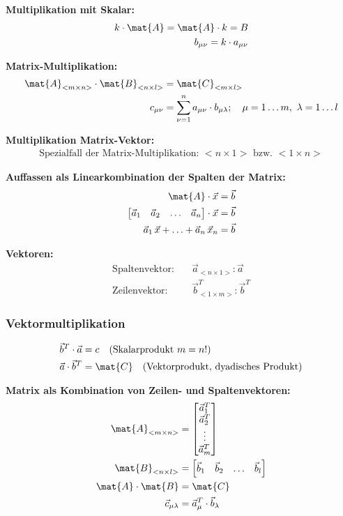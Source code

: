 \textbf{Multiplikation mit Skalar:}
\begin{align*}
k \cdot \mat{A} = \mat{A} \cdot k = B\\
b_{\mu\nu} = k \cdot a_{\mu\nu}
\end{align*}

\textbf{Matrix-Multiplikation:}
\begin{align*}
\mat{A}_{<m\times n>} \cdot \mat{B}_{<n\times l>} &= \mat{C}_{<m\times l>}\\
c_{\mu\nu} &= \sum_{\nu=1}^{n} a_{\mu\nu} \cdot b_{\mu\lambda};\quad \mu=1\ldots m,\ \lambda=1\ldots l
\end{align*}

\textbf{Multiplikation Matrix-Vektor:}
\begin{align*}
\text{Spezialfall der Matrix-Multiplikation: } <n\times 1> \text{ bzw. } <1\times n>
\end{align*}

\textbf{Auffassen als Linearkombination der Spalten der Matrix:}
\begin{align*}
\mat{A} \cdot \vec{x} &= \vec{b}\\
\begin{bmatrix}\vec{a}_1 & \vec{a}_2 & \ldots & \vec{a}_n\end{bmatrix} \cdot \vec{x} &= \vec{b}\\
\vec{a}_1\,\vec{x} + \ldots + \vec{a}_n\,\vec{x}_n &= \vec{b}
\end{align*}

\textbf{Vektoren:}
\begin{align*}
\text{Spaltenvektor:} \quad & \vec{a}_{<n\times 1>}: \vec{a}\\
\text{Zeilenvektor:} \quad & \vec{b}_{<1\times m>}^T: \vec{b}^T
\end{align*}

\subsubsection{Vektormultiplikation}
\begin{align*}
\vec{b}^T\cdot \vec{a} &= c \quad \text{(Skalarprodukt $m=n$!)}\\
\vec{a} \cdot \vec{b}^T &= \mat{C} \quad \text{(Vektorprodukt, dyadisches Produkt)}
\end{align*}

\textbf{Matrix als Kombination von Zeilen- und Spaltenvektoren:}
\begin{align*}
\mat{A}_{<m\times n>} &= \begin{bmatrix} \vec{a}_1^T \\ \vec{a}_2^T \\ \vdots \\ \vec{a}_m^T \end{bmatrix}\\
\mat{B}_{<n\times l>} &= \begin{bmatrix} \vec{b}_1 & \vec{b}_2 & \ldots & \vec{b}_l \end{bmatrix}\\
\mat{A} \cdot \mat{B} &= \mat{C}\\
\vec{c}_{\mu\lambda} &= \vec{a}_\mu^T \cdot \vec{b}_\lambda
\end{align*}

